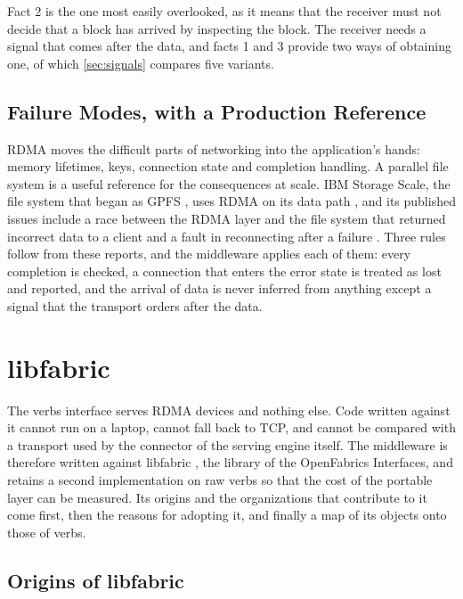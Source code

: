 Fact 2 is the one most easily overlooked, as it means that the receiver must
not decide that a block has arrived by inspecting the block. The receiver
needs a signal that comes after the data, and facts 1 and 3 provide two ways
of obtaining one, of which \cref{sec:signals} compares five variants.

\subsection{Failure Modes, with a Production Reference}

RDMA moves the difficult parts of networking into the application's hands: memory
lifetimes, keys, connection state and completion handling. A parallel file
system is a useful reference for the consequences at scale. IBM Storage Scale,
the file system that began as GPFS \citep{schmuck2002gpfs}, uses RDMA on its
data path \citep{wuerthner2021gpfsrdma}, and its published issues include
a race between the RDMA layer and the file system that returned incorrect
data to a client \citep{ibm_ij44629} and a fault in reconnecting after a
failure \citep{ibm_iv61625}. Three rules follow from these reports, and the middleware applies each of
them: every completion is checked, a connection that enters the error state
is treated as lost and reported, and the arrival of data is never inferred
from anything except a signal that the transport orders after the data.

\section{libfabric}
\label{ch:libfabric}

The verbs interface serves RDMA devices and nothing else. Code written
against it cannot run on a laptop, cannot fall back to TCP, and cannot be
compared with a transport used by the connector of the serving engine itself.
The middleware is therefore written against libfabric
\citep{grun2015ofi,libfabric_repo}, the library of the OpenFabrics
Interfaces, and retains a second implementation on raw verbs so that the cost
of the portable layer can be measured. Its origins and the organizations
that contribute to it come first, then the reasons for adopting it, and
finally a map of its objects onto those of verbs.

\subsection{Origins of libfabric}
\label{sec:ofi-history}

